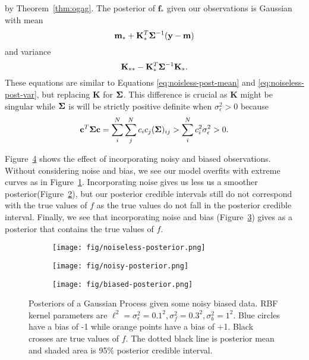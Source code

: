 by Theorem~\ref{thm:ogag}.
The posterior of $\mathbf{f}_*$ given our observations is Gaussian with mean
\begin{equation*}
    \mathbf{m}_* + \mathbf{K}_*^T \boldsymbol{\Sigma}^{-1} (\mathbf{y} - \mathbf{m})
\end{equation*}
and variance
\begin{equation*}
    \mathbf{K}_{* *} - \mathbf{K}_*^T \boldsymbol{\Sigma}^{-1} \mathbf{K}_*.
\end{equation*}
These equations are similar to Equations \ref{eq:noisless-post-mean} and \ref{eq:noiseless-post-var}, but replacing $\mathbf{K}$ for $\boldsymbol{\Sigma}$.
This difference is crucial as $\mathbf{K}$ might be singular
while $\boldsymbol{\Sigma}$ is will be strictly positive definite when $\sigma_{\epsilon}^2 > 0$ because
\begin{align*}
    \mathbf{c}^{T} \boldsymbol{\Sigma} \mathbf{c}
    = \sum_i^{N}\sum_{j}^{N} c_ic_j (\boldsymbol{\Sigma})_{ij}
    > \sum_{i}^{N}c_{i}^2 \sigma_{\epsilon}^{2}
    > 0.
\end{align*}

Figure~\ref{fig:gp-posteriors} shows the effect of incorporating noisy and biased observations.
Without considering noise and bias, we see our model overfits with extreme curves as in Figure~\ref{subfig:noiseless-post}.
Incorporating noise gives us less us a smoother posterior(Figure~\ref{subfig:noisy-posterior}),
but our posterior credible intervals still do not correspond with the true values of $f$ as the true values do not fall in the posterior credible interval.
Finally, we see that incorporating noise and bias (Figure~\ref{subfig:biased-posterior}) gives as a posterior that
contains the true values of $f$.


\begin{figure}
    \centering
    \begin{subfigure}[b]{0.3\textwidth}
        \centering
        \texttt{[image: fig/noiseless-posterior.png]}
        \caption{}
        \label{subfig:noiseless-post}
    \end{subfigure}
    \hfill
    \begin{subfigure}[b]{0.3\textwidth}
        \centering
        \texttt{[image: fig/noisy-posterior.png]}
        \caption{}
        \label{subfig:noisy-posterior}
    \end{subfigure}
    \hfill
    \begin{subfigure}[b]{0.3\textwidth}
        \centering
        \texttt{[image: fig/biased-posterior.png]}
        \caption{}
        \label{subfig:biased-posterior}
    \end{subfigure}
    \hfill
    \caption{Posteriors of a Gaussian Process given some noisy biased data.
    RBF kernel parameters are $\ell^{2}  = \sigma^2_{\epsilon} = 0.1^2, \sigma^2_{f} = 0.3 ^ 2, \sigma^2_b = 1^2$.
    Blue circles have a bias of -1 while orange points have a bias of +1.
    Black crosses are true values of $f$.
    The dotted black line is posterior mean and shaded area is 95\% posterior credible interval.
    }
    \label{fig:gp-posteriors}
\end{figure}

